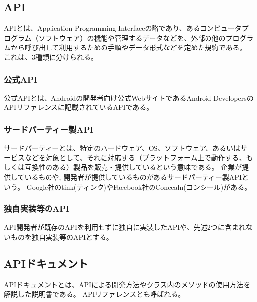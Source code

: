 \subsection{API}
APIとは、Application Programming Interfaceの略であり、あるコンピュータプログラム（ソフトウェア）の機能や管理するデータなどを、外部の他のプログラムから呼び出して利用するための手順やデータ形式などを定めた規約である。
これは、3種類に分けられる。

\subsubsection {公式API}
公式APIとは、Androidの開発者向け公式WebサイトであるAndroid DevelopersのAPIリファレンスに記載されているAPIである。

\subsubsection {サードパーティー製API}
サードパーティーとは、特定のハードウェア、OS、ソフトウェア、あるいはサービスなどを対象として、それに対応する（プラットフォーム上で動作する、もしくは互換性のある）製品を販売・提供しているという意味である。
企業が提供しているものや, 開発者が提供しているものがあるサードパーティー製APIという。
Google社のtink(ティンク)やFacebook社のConcealn(コンシール)がある。

\subsubsection {独自実装等のAPI}
API開発者が既存のAPIを利用せずに独自に実装したAPIや、先述2つに含まれないものを独自実装等のAPIとする。


\subsection{APIドキュメント}
APIドキュメントとは、APIによる開発方法やクラス内のメソッドの使用方法を解説した説明書である。
APIリファレンスとも呼ばれる。




























